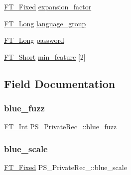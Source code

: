 \begin{DoxyCompactItemize}
\item 
\hyperlink{fttypes_8h_a5f5a679cc09f758efdd0d1c5feed3c3d}{F\+T\+\_\+\+Fixed} \hyperlink{struct_p_s___private_rec___a45cf6e07c4c26f029e66998e6cad9fa0}{expansion\+\_\+factor}
\item 
\hyperlink{fttypes_8h_a7fa72a1f0e79fb1860c5965789024d6f}{F\+T\+\_\+\+Long} \hyperlink{struct_p_s___private_rec___afc2a7f950a174577ebfc062bb1598f5c}{language\+\_\+group}
\item 
\hyperlink{fttypes_8h_a7fa72a1f0e79fb1860c5965789024d6f}{F\+T\+\_\+\+Long} \hyperlink{struct_p_s___private_rec___a309a871cdeb6f658d8fbff23fa13b667}{password}
\item 
\hyperlink{fttypes_8h_aa7279be89046a2563cd3d4d6651fbdcf}{F\+T\+\_\+\+Short} \hyperlink{struct_p_s___private_rec___af8c829e03c424b1f12b2c9cd4041a868}{min\+\_\+feature} \mbox{[}2\mbox{]}
\end{DoxyCompactItemize}


\subsection{Field Documentation}
\mbox{\label{struct_p_s___private_rec___a21fbb2665f25cd0d769d023ca8063319}} 
\subsubsection{\texorpdfstring{blue\+\_\+fuzz}{blue\_fuzz}}
{\footnotesize\ttfamily \hyperlink{fttypes_8h_af90e5fb0d07e21be9fe6faa33f02484c}{F\+T\+\_\+\+Int} P\+S\+\_\+\+Private\+Rec\+\_\+\+::blue\+\_\+fuzz}

\mbox{\label{struct_p_s___private_rec___aef435ab2e5ad52aa4e2ad3eed14b6666}} 
\subsubsection{\texorpdfstring{blue\+\_\+scale}{blue\_scale}}
{\footnotesize\ttfamily \hyperlink{fttypes_8h_a5f5a679cc09f758efdd0d1c5feed3c3d}{F\+T\+\_\+\+Fixed} P\+S\+\_\+\+Private\+Rec\+\_\+\+::blue\+\_\+scale}

